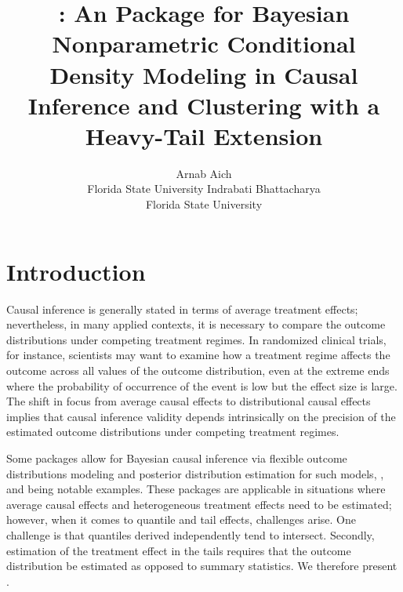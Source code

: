 \documentclass[article]{jss}\usepackage[]{graphicx}\usepackage[]{xcolor}
\author{Arnab Aich\\Florida State University \And Indrabati Bhattacharya\\Florida State University}
\title{\pkg{CausalMixGPD}: An \proglang{R} Package for Bayesian Nonparametric Conditional Density Modeling in Causal Inference and Clustering with a Heavy-Tail Extension}
\begin{document}
\section{Introduction}

Causal inference is generally stated in terms of average treatment
effects; nevertheless, in many applied contexts, it is necessary to
compare the outcome distributions under competing treatment regimes.
In randomized clinical trials, for instance, scientists may want to
examine how a treatment regime affects the outcome across all values
of the outcome distribution, even at the extreme ends where the
probability of occurrence of the event is low but the effect size is
large. The shift in focus from average causal effects to
distributional causal effects implies that causal inference validity
depends intrinsically on the precision of the estimated outcome
distributions under competing treatment regimes.

Some  packages allow for Bayesian causal inference via
flexible outcome distributions modeling and posterior distribution
estimation for such models,
 \citep{bcf_method,bcf_pkg}, and 
\citep{bartCause_method,bartCause_pkg} being notable examples. These packages are
applicable in situations where average causal effects and
heterogeneous treatment effects need to be estimated; however, when it
comes to quantile and tail effects, challenges arise. One challenge
is that quantiles derived independently tend to intersect. Secondly,
estimation of the treatment effect in the tails requires that the
outcome distribution be estimated as opposed to summary statistics.
We therefore present .
\end{document}
